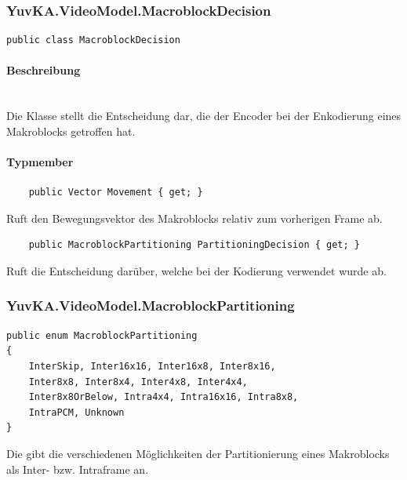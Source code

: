 \subsubsection{YuvKA.VideoModel.MacroblockDecision}

\begin{verbatim}
public class MacroblockDecision
\end{verbatim}

\paragraph{Beschreibung}~\\
Die Klasse  stellt die Entscheidung dar, die der Encoder bei der Enkodierung eines Makroblocks getroffen hat.

\paragraph{Typmember}
\begin{itemize}

	\begin{verbatim}
	public Vector Movement { get; }
	\end{verbatim}
	Ruft den Bewegungsvektor des Makroblocks relativ zum vorherigen Frame ab.

	\begin{verbatim}
	public MacroblockPartitioning PartitioningDecision { get; }
	\end{verbatim}
	Ruft die Entscheidung darüber, welche  bei der Kodierung verwendet wurde ab.

\end{itemize}

\subsubsection{YuvKA.VideoModel.MacroblockPartitioning}

\begin{verbatim}
public enum MacroblockPartitioning
{
    InterSkip, Inter16x16, Inter16x8, Inter8x16,
    Inter8x8, Inter8x4, Inter4x8, Inter4x4,
    Inter8x8OrBelow, Intra4x4, Intra16x16, Intra8x8,
    IntraPCM, Unknown
}
\end{verbatim}
Die  gibt die verschiedenen Möglichkeiten der Partitionierung eines Makroblocks als Inter- bzw. Intraframe an.

